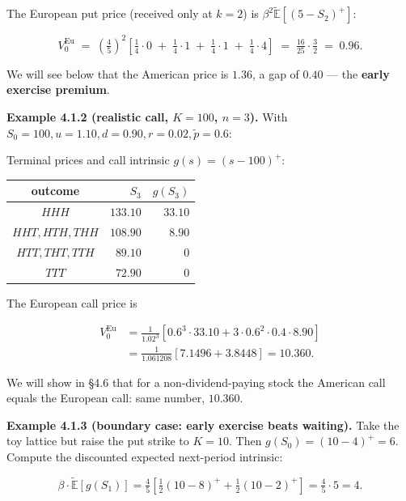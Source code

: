 \documentclass[
  10pt,
  twoside]{book}
\newcounter{none} %
\begin{document}
The European put price (received only at \(k=2\)) is
\(\beta^2 \tilde{\mathbb{E}}[(5 - S_2)^+]\):

\[V_0^{\text{Eu}} \;=\; \left(\tfrac{4}{5}\right)^{2}\!\left[\tfrac{1}{4}\!\cdot\!0 \;+\; \tfrac{1}{4}\!\cdot\!1 \;+\; \tfrac{1}{4}\!\cdot\!1 \;+\; \tfrac{1}{4}\!\cdot\!4\right] \;=\; \tfrac{16}{25}\!\cdot\!\tfrac{3}{2} \;=\; 0.96.\]

We will see below that the American price is \(1.36\), a gap of \(0.40\)
--- the \textbf{early exercise premium}.

\textbf{Example 4.1.2 (realistic call, \(K=100\), \(n=3\)).} With
\(S_0 = 100, u = 1.10, d = 0.90, r = 0.02, \tilde p = 0.6\):

Terminal prices and call intrinsic \(g(s) = (s - 100)^+\):

{\def\LTcaptype{none} %
\begin{table}[H]
\centering
\begin{tabular}{|c|r|r|}
\toprule
outcome & \(S_3\) & \(g(S_3)\) \\
\midrule



\(HHH\) & \(133.10\) & \(33.10\) \\
\(HHT, HTH, THH\) & \(108.90\) & \(8.90\) \\
\(HTT, THT, TTH\) & \(89.10\) & \(0\) \\
\(TTT\) & \(72.90\) & \(0\) \\
\bottomrule
\end{tabular}
\end{table}
}

The European call price is

\[\begin{aligned}
V_0^{\text{Eu}} &= \frac{1}{1.02^3}\!\left[0.6^3 \cdot 33.10 + 3\cdot 0.6^2 \cdot 0.4 \cdot 8.90\right] \\
&= \frac{1}{1.061208}\!\left[7.1496 + 3.8448\right] = 10.360.
\end{aligned}\]

We will show in §4.6 that for a non-dividend-paying stock the American
call equals the European call: same number, \(10.360\).

\textbf{Example 4.1.3 (boundary case: early exercise beats waiting).}
Take the toy lattice but raise the put strike to \(K = 10\). Then
\(g(S_0) = (10 - 4)^+ = 6\). Compute the discounted expected next-period
intrinsic:

\[\beta\!\cdot\!\tilde{\mathbb{E}}[g(S_1)] = \tfrac{4}{5}\!\left[\tfrac{1}{2}(10 - 8)^+ + \tfrac{1}{2}(10 - 2)^+\right] = \tfrac{4}{5}\cdot 5 = 4.\]
\end{document}
